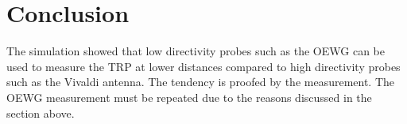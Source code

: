 \section{Conclusion}

The simulation showed that low directivity probes such as the \ac{OEWG} can be used to measure the \ac{TRP} at lower distances compared to high directivity probes such as the Vivaldi antenna. The tendency is proofed by the measurement. The \ac{OEWG} measurement must be repeated due to the reasons discussed in the section above.





